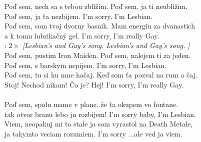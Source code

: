 
Poď sem, nech sa s tebou zblížim.
Poď sem, ja ti neubližim.\\
Poď sem, ja ťa nezbijem.
I'm sorry, I'm Lesbian.\\

Poď sem, som tvoj dvorny basnik.
Mam energiu za dvanastich\\
a k tomu lubrikačný gel.
I'm sorry, I'm really Gay.\\

\textregistered:
$2\times$ \emph{[Lesbian's and Gay's song. Lesbian's and Gay's song. ]}\\

Poď sem, pustim Iron Maiden.
Poď sem, nalejem ti za jeden.\\
Poď sem, s barskym nepijem.
I'm sorry, I'm Lesbian.\\

Poď sem, tu si ku mne hačaj.
Keď som ťa pozval na rum a čaj.\\
Stoj! Nechod nikam! Čo je? Hej!
I'm sorry, I'm really Gay.\\

\textregistered\\

Poď sem, spolu mame v plane.
že ťa okupem vo fontane.\\
tak otvor branu lebo ju rozbijem!
I'm sorry baby, I'm Lesbian.\\

Viem, neopakuj mi to stale
ja som vyrastol na Death Metale,\\
ja takymto veciam rozumiem.
I'm sorry ...ale ved ja viem.\\

\textregistered \textregistered

\newpage
